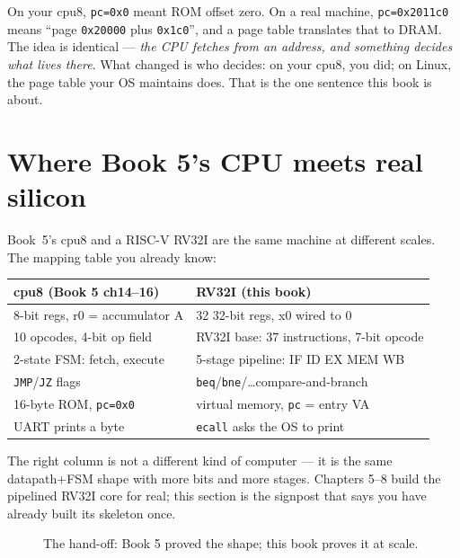 \begin{example}
\label{ex:bridge}
On your cpu8, \texttt{pc=0x0} meant ROM offset zero. On a real machine,
\texttt{pc=0x2011c0} means ``page \texttt{0x20000} plus \texttt{0x1c0}'',
and a page table translates that to DRAM. The idea is identical ---
\emph{the CPU fetches from an address, and something decides what lives
there}. What changed is who decides: on your cpu8, you did; on Linux,
the page table your OS maintains does. That is the one sentence this
book is about.
\end{example}

\section{Where Book 5's CPU meets real silicon}
\label{sec:bridge01}

Book~5's cpu8 and a RISC-V RV32I are the same machine at different
scales. The mapping table you already know:

\begin{center}
\begin{tabularx}{\linewidth}{lX}
\toprule
\textbf{cpu8 (Book 5 ch14--16)} & \textbf{RV32I (this book)} \\
\midrule
8-bit regs, r0 = accumulator A &
   32 32-bit regs, x0 wired to 0 \\
10 opcodes, 4-bit op field &
   RV32I base: 37 instructions, 7-bit opcode \\
2-state FSM: fetch, execute &
   5-stage pipeline: IF ID EX MEM WB \\
\texttt{JMP}/\texttt{JZ} flags &
   \texttt{beq}/\texttt{bne}/\dots compare-and-branch \\
16-byte ROM, \texttt{pc=0x0} &
   virtual memory, \texttt{pc} = entry VA \\
UART prints a byte &
   \texttt{ecall} asks the OS to print \\
\bottomrule
\end{tabularx}
\end{center}

The right column is not a different kind of computer --- it is the same
datapath+FSM shape with more bits and more stages. Chapters 5--8 build
the pipelined RV32I core for real; this section is the signpost that
says you have already built its skeleton once.

\begin{figure}[htbp]
\centering

\caption{The hand-off: Book 5 proved the shape; this book proves it at
scale.}
\label{fig:handoff01}
\end{figure}


